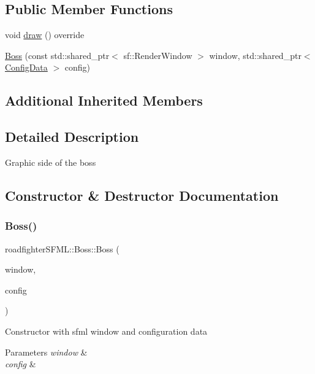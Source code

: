 \subsection*{Public Member Functions}
\begin{DoxyCompactItemize}
\item 
void \hyperlink{classroadfighterSFML_1_1Boss_a73041bc4cc4446fcf4605abe1052aa03}{draw} () override
\item 
\hyperlink{classroadfighterSFML_1_1Boss_ab56271ba9dfb9c945ee22cf7e5237d3d}{Boss} (const std\+::shared\+\_\+ptr$<$ sf\+::\+Render\+Window $>$ window, std\+::shared\+\_\+ptr$<$ \hyperlink{classConfigData}{Config\+Data} $>$ config)
\end{DoxyCompactItemize}
\subsection*{Additional Inherited Members}


\subsection{Detailed Description}
Graphic side of the boss 

\subsection{Constructor \& Destructor Documentation}
\mbox{\label{classroadfighterSFML_1_1Boss_ab56271ba9dfb9c945ee22cf7e5237d3d}} 
\subsubsection{\texorpdfstring{Boss()}{Boss()}}
{\footnotesize\ttfamily roadfighter\+S\+F\+M\+L\+::\+Boss\+::\+Boss (\begin{DoxyParamCaption}\item[{const std\+::shared\+\_\+ptr$<$ sf\+::\+Render\+Window $>$}]{window,  }\item[{std\+::shared\+\_\+ptr$<$ \hyperlink{classConfigData}{Config\+Data} $>$}]{config }\end{DoxyParamCaption})}

Constructor with sfml window and configuration data 
\begin{DoxyParams}{Parameters}
{\em window} & \\
\hline
{\em config} & \\
\hline
\end{DoxyParams}


